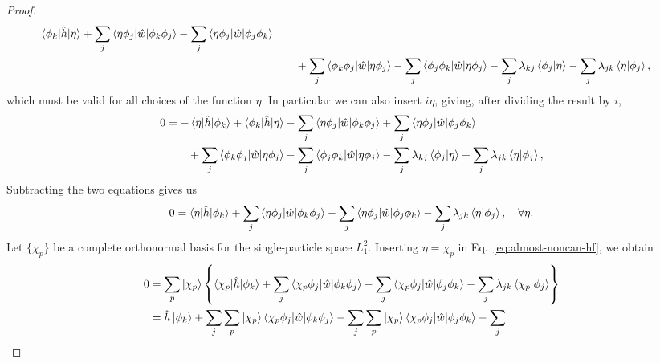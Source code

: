 \documentclass{report}
\theoremstyle{plain}
\theoremstyle{definition}
\begin{document}
\begin{proof}
\begin{equation}
\begin{split}
      \braket{\phi_k|\hat{h}|\eta} 
       + \sum_j
      \braket{\eta\phi_j|\hat{w}|\phi_k\phi_j} - \sum_j
      \braket{\eta\phi_j|\hat{w}|\phi_j\phi_k} 
      \\ &\qquad + 
      \sum_j\braket{\phi_k\phi_j|\hat{w}|\eta\phi_j} - \sum_j\braket{\phi_j
        \phi_k|\hat{w}|\eta\phi_j} - \sum_j
      \lambda_{kj}\braket{\phi_j|\eta} - \sum_j
      \lambda_{jk}\braket{\eta|\phi_j},
    \end{split}
  \end{equation}
  which must be valid for all choices of the function $\eta$. In
  particular we can also insert $i\eta$, giving, after dividing the
  result by $i$,
  \begin{equation}
    \begin{split}
    0 &=       -\braket{\eta|\hat{h}|\phi_k} +
      \braket{\phi_k|\hat{h}|\eta} 
       - \sum_j
      \braket{\eta\phi_j|\hat{w}|\phi_k\phi_j} + \sum_j
      \braket{\eta\phi_j|\hat{w}|\phi_j\phi_k} 
      \\ &\qquad + 
      \sum_j\braket{\phi_k\phi_j|\hat{w}|\eta\phi_j} - \sum_j\braket{\phi_j
        \phi_k|\hat{w}|\eta\phi_j} - \sum_j
      \lambda_{kj}\braket{\phi_j|\eta} + \sum_j
      \lambda_{jk}\braket{\eta|\phi_j},
    \end{split}
  \end{equation}
  Subtracting the two equations gives us
  \begin{equation}
    0 = \braket{\eta|\hat{h}|\phi_k} 
      + \sum_j
      \braket{\eta\phi_j|\hat{w}|\phi_k\phi_j} - \sum_j
      \braket{\eta\phi_j|\hat{w}|\phi_j\phi_k} - \sum_j
      \lambda_{jk}\braket{\eta|\phi_j} , \quad \forall \eta.
      \label{eq:almost-noncan-hf}
    \end{equation}
    Let $\{\chi_p\}$ be a complete orthonormal basis for the single-particle
    space $L^2_1$. 
    Inserting $\eta = \chi_p$ in Eq.~\eqref{eq:almost-noncan-hf}, we
    obtain
    \begin{equation}
      \begin{split}
        0 &= \sum_p \ket{\chi_p}\left\{\braket{\chi_p|\hat{h}|\phi_k} 
          + \sum_j
          \braket{\chi_p\phi_j|\hat{w}|\phi_k\phi_j} - \sum_j
          \braket{\chi_p\phi_j|\hat{w}|\phi_j\phi_k} - \sum_j
          \lambda_{jk} \braket{\chi_p|\phi_j} \right\} \\ 
        & = \hat{h}\ket{\phi_k} +       \sum_j \sum_p \ket{\chi_p} 
        \braket{\chi_p\phi_j|\hat{w}|\phi_k\phi_j} - \sum_j\sum_p \ket{\chi_p} 
        \braket{\chi_p\phi_j|\hat{w}|\phi_j\phi_k} - \sum_j

\end{split}
\end{equation}
\end{proof}
\end{document}
